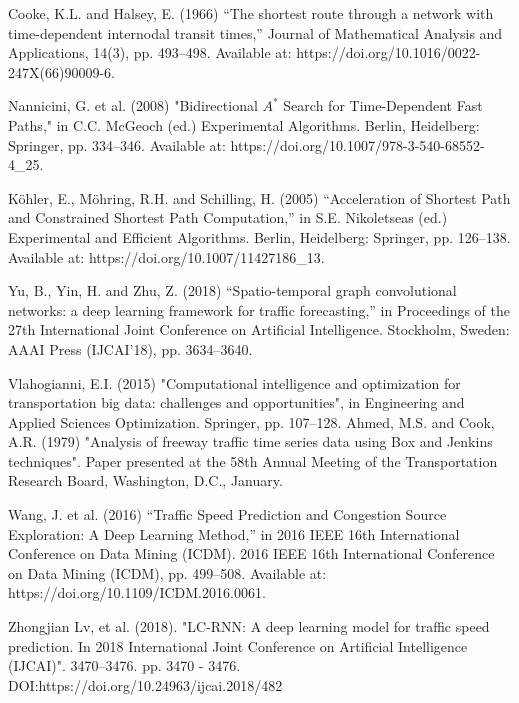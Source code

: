 \begin{thebibliography}{99}
        Cooke, K.L. and Halsey, E. (1966) “The shortest route through a network with time-dependent internodal transit times,” Journal of Mathematical Analysis and Applications, 14(3), pp. 493–498. Available at: https://doi.org/10.1016/0022-247X(66)90009-6.


        Nannicini, G. et al. (2008) "Bidirectional $A^*$ Search for Time-Dependent Fast Paths," in C.C. McGeoch (ed.) Experimental Algorithms. Berlin, Heidelberg: Springer, pp. 334–346. Available at: https://doi.org/10.1007/978-3-540-68552-4\_25.
        
        Köhler, E., Möhring, R.H. and Schilling, H. (2005) “Acceleration of Shortest Path and Constrained Shortest Path Computation,” in S.E. Nikoletseas (ed.) Experimental and Efficient Algorithms. Berlin, Heidelberg: Springer, pp. 126–138. Available at: https://doi.org/10.1007/11427186\_13.

        Yu, B., Yin, H. and Zhu, Z. (2018) “Spatio-temporal graph convolutional networks: a deep learning framework for traffic forecasting,” in Proceedings of the 27th International Joint Conference on Artificial Intelligence. Stockholm, Sweden: AAAI Press (IJCAI’18), pp. 3634–3640.

        Vlahogianni, E.I. (2015) "Computational intelligence and optimization for transportation big data: challenges and opportunities", in Engineering and Applied Sciences Optimization. Springer, pp. 107–128.        
        Ahmed, M.S. and Cook, A.R. (1979) "Analysis of freeway traffic time series data using Box and Jenkins techniques". Paper presented at the 58th Annual Meeting of the Transportation Research Board, Washington, D.C., January.


        
        Wang, J. et al. (2016) “Traffic Speed Prediction and Congestion Source Exploration: A Deep Learning Method,” in 2016 IEEE 16th International Conference on Data Mining (ICDM). 2016 IEEE 16th International Conference on Data Mining (ICDM), pp. 499–508. Available at: https://doi.org/10.1109/ICDM.2016.0061.


        Zhongjian Lv, et al. (2018). "LC-RNN: A deep learning model for traffic speed prediction. In 2018 International Joint Conference on Artificial Intelligence (IJCAI)". 3470–3476.
        pp. 3470 - 3476. DOI:https://doi.org/10.24963/ijcai.2018/482



\end{thebibliography}
